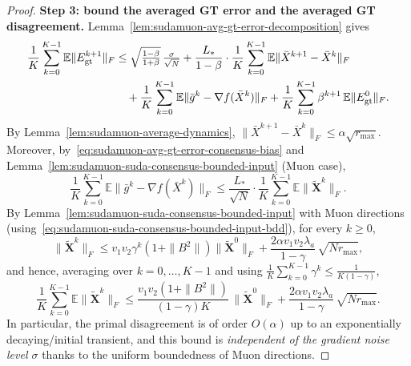 \documentclass{article}
\begin{document}
\begin{proof}
\medskip\noindent\textbf{Step 3: bound the averaged GT error and the averaged GT disagreement.}
Lemma~\ref{lem:sudamuon-avg-gt-error-decomposition} gives
\begin{align}
\label{eq:pf-final-Egt-bound}
\frac{1}{K}\sum_{k=0}^{K-1}\mathbb{E}\|E_{\rm gt}^{k+1}\|_F
&\le \sqrt{\tfrac{1-\beta}{1+\beta}}\,\tfrac{\sigma}{\sqrt N}
+\frac{L_*}{1-\beta}\cdot \frac{1}{K}\sum_{k=0}^{K-1}\mathbb{E}\|\bar X^{k+1}-\bar X^k\|_F
\notag\\
&\quad +\frac{1}{K}\sum_{k=0}^{K-1}\mathbb{E}\|\bar g^k-\nabla f(\bar X^k)\|_F
+\frac{1}{K}\sum_{k=0}^{K-1}\beta^{k+1}\,\mathbb{E}\|E_{\rm gt}^{0}\|_F.
\end{align}
By Lemma~\ref{lem:sudamuon-average-dynamics}, $\|\bar X^{k+1}-\bar X^k\|_F\le \alpha\sqrt{r_{\max}}$.
Moreover, by~\eqref{eq:sudamuon-avg-gt-error-consensus-bias} and Lemma~\ref{lem:sudamuon-suda-consensus-bounded-input} (Muon case),
\[
\frac{1}{K}\sum_{k=0}^{K-1}\mathbb{E}\|\bar g^k-\nabla f(\bar X^k)\|_F
\le \frac{L_*}{\sqrt N}\cdot \frac{1}{K}\sum_{k=0}^{K-1}\mathbb{E}\|\tilde{\mathbf X}^k\|_F.
\]
By Lemma~\ref{lem:sudamuon-suda-consensus-bounded-input} with Muon directions (using~\eqref{eq:sudamuon-suda-consensus-bounded-input-bdd}), for every $k\ge 0$,
\[
\|\tilde{\mathbf X}^k\|_F
\le v_1v_2\gamma^k(1+\|B^2\|)\|\tilde{\mathbf X}^0\|_F
+\frac{2\alpha v_1v_2\lambda_a}{1-\gamma}\,\sqrt{Nr_{\max}},
\]
and hence, averaging over $k=0,\dots,K-1$ and using $\frac1K\sum_{k=0}^{K-1}\gamma^k\le \frac{1}{K(1-\gamma)}$,
\[
\frac{1}{K}\sum_{k=0}^{K-1}\mathbb{E}\|\tilde{\mathbf X}^k\|_F
\le \frac{v_1v_2(1+\|B^2\|)}{(1-\gamma)K}\,\|\tilde{\mathbf X}^0\|_F
+\frac{2\alpha v_1v_2\lambda_a}{1-\gamma}\,\sqrt{Nr_{\max}}.
\]
In particular, the primal disagreement is of order $O(\alpha)$ up to an exponentially decaying/initial transient, and this bound is \emph{independent of the gradient noise level $\sigma$} thanks to the uniform boundedness of Muon directions.


\end{proof}
\end{document}
